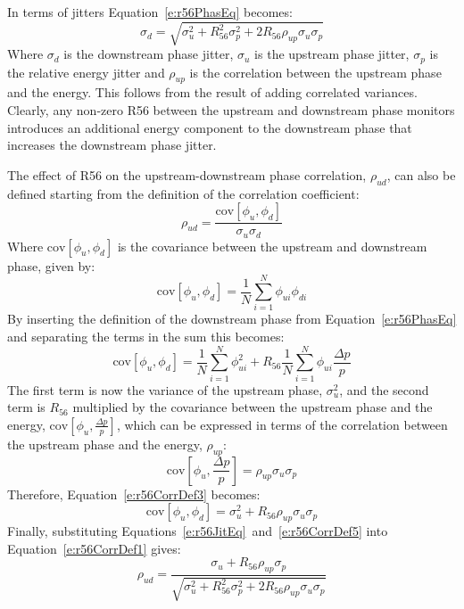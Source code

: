In terms of jitters Equation~\ref{e:r56PhasEq} becomes:
\begin{equation}
\sigma_d = \sqrt{\sigma_u^2 + R_{56}^2\sigma_{p}^2 + 2R_{56}\rho_{up}\sigma_{u}\sigma_{p}}
\label{e:r56JitEq}
\end{equation}
Where \(\sigma_d\) is the downstream phase jitter, \(\sigma_u\) is the upstream phase jitter, \(\sigma_p\) is the relative energy jitter and \(\rho_{up}\) is the correlation between the upstream phase and the energy. This follows from the result of adding correlated variances. Clearly, any non-zero R56 between the upstream and downstream phase monitors introduces an additional energy component to the downstream phase that increases the downstream phase jitter.

The effect of R56 on the upstream-downstream phase correlation, \(\rho_{ud}\), can also be defined starting from the definition of the correlation coefficient:
\begin{equation}
\rho_{ud} = \frac{\mathrm{cov}\left[\phi_u,\phi_d\right]}{\sigma_u\sigma_d}
\label{e:r56CorrDef1}
\end{equation}
Where \(\mathrm{cov}\left[\phi_u,\phi_d\right]\) is the covariance between the upstream and downstream phase, given by:
\begin{equation}
 \mathrm{cov}\left[\phi_u,\phi_d\right] = \frac{1}{N} \sum_{i=1}^{N}\phi_{ui}\phi_{di}
\label{e:r56CorrDef2}
\end{equation} 
By inserting the definition of the downstream phase from Equation~\ref{e:r56PhasEq} and separating the terms in the sum this becomes:
\begin{equation}
\mathrm{cov}\left[\phi_u,\phi_d\right] = \frac{1}{N} \sum_{i=1}^{N}\phi_{ui}^{2} + R_{56}\frac{1}{N} \sum_{i=1}^{N}\phi_{ui}\frac{\Delta p}{p}
\label{e:r56CorrDef3}
\end{equation}
The first term is now the variance of the upstream phase, \(\sigma_u^2\), and the second term is \(R_{56}\) multiplied by the covariance between the upstream phase and the energy, \(\mathrm{cov}\left[\phi_u,\frac{\Delta p}{p}\right]\), which can be expressed in terms of the correlation between the upstream phase and the energy, \(\rho_{up}\):
\begin{equation}
\mathrm{cov}\left[\phi_u,\frac{\Delta p}{p}\right] = \rho_{up}\sigma_u\sigma_{p}
\label{e:r56CorrDef4}
\end{equation}
Therefore, Equation~\ref{e:r56CorrDef3} becomes:
\begin{equation}
\mathrm{cov}\left[\phi_u,\phi_d\right] = \sigma_u^2 + R_{56}\rho_{up}\sigma_u\sigma_p
\label{e:r56CorrDef5}
\end{equation}
Finally, substituting Equations~\ref{e:r56JitEq}~and~\ref{e:r56CorrDef5} into Equation~\ref{e:r56CorrDef1} gives:
\begin{equation}
\rho_{ud} = \frac{\sigma_u + R_{56}\rho_{up}\sigma_p}{\sqrt{\sigma_u^2 + R_{56}^2\sigma_{p}^2 + 2R_{56}\rho_{up}\sigma_{u}\sigma_{p}}}
\label{e:r56CorrDefFinal}
\end{equation}

